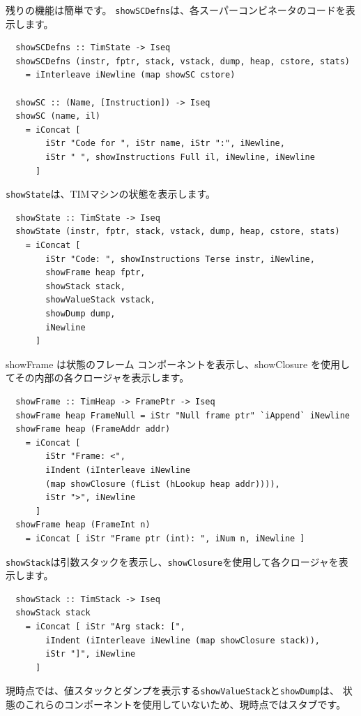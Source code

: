 \documentclass{jbook}
\begin{document}
残りの機能は簡単です。
\texttt{showSCDefns}は、各スーパーコンビネータのコードを表示します。

\begin{verbatim}
  showSCDefns :: TimState -> Iseq
  showSCDefns (instr, fptr, stack, vstack, dump, heap, cstore, stats)
    = iInterleave iNewline (map showSC cstore)

  showSC :: (Name, [Instruction]) -> Iseq
  showSC (name, il)
    = iConcat [
        iStr "Code for ", iStr name, iStr ":", iNewline,
        iStr " ", showInstructions Full il, iNewline, iNewline
      ]
\end{verbatim}

\texttt{showState}は、TIMマシンの状態を表示します。

\begin{verbatim}
  showState :: TimState -> Iseq
  showState (instr, fptr, stack, vstack, dump, heap, cstore, stats)
    = iConcat [
        iStr "Code: ", showInstructions Terse instr, iNewline,
        showFrame heap fptr,
        showStack stack,
        showValueStack vstack,
        showDump dump,
        iNewline
      ]
\end{verbatim}

showFrame は状態のフレーム コンポーネントを表示し、showClosure を使用してその内部の各クロージャを表示します。

\begin{verbatim}
  showFrame :: TimHeap -> FramePtr -> Iseq
  showFrame heap FrameNull = iStr "Null frame ptr" `iAppend` iNewline
  showFrame heap (FrameAddr addr)
    = iConcat [
        iStr "Frame: <",
        iIndent (iInterleave iNewline
        (map showClosure (fList (hLookup heap addr)))),
        iStr ">", iNewline
      ]
  showFrame heap (FrameInt n)
    = iConcat [ iStr "Frame ptr (int): ", iNum n, iNewline ]
\end{verbatim}

\texttt{showStack}は引数スタックを表示し、\texttt{showClosure}を使用して各クロージャを表示します。

\begin{verbatim}
  showStack :: TimStack -> Iseq
  showStack stack
    = iConcat [ iStr "Arg stack: [",
        iIndent (iInterleave iNewline (map showClosure stack)),
        iStr "]", iNewline
      ]
\end{verbatim}

現時点では、値スタックとダンプを表示する\texttt{showValueStack}と\texttt{showDump}は、
状態のこれらのコンポーネントを使用していないため、現時点ではスタブです。
\end{document}

